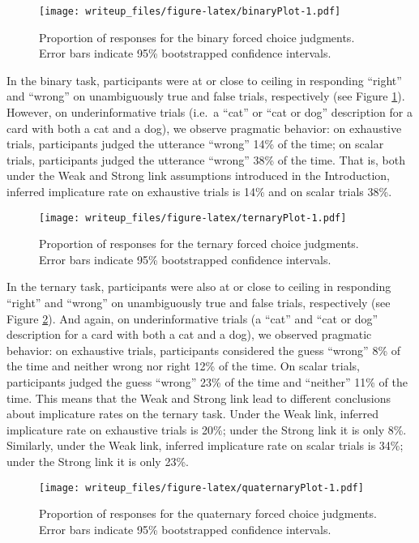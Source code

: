 \documentclass[man]{apa6}
\theoremstyle{definition}
\theoremstyle{definition}
\theoremstyle{definition}
\theoremstyle{remark}
\begin{document}
\begin{figure}
\centering
\texttt{[image: writeup\_files/figure-latex/binaryPlot-1.pdf]}
\caption{\label{fig:binaryPlot}Proportion of responses for the binary forced
choice judgments. Error bars indicate 95\% bootstrapped confidence
intervals.}
\end{figure}

In the binary task, participants were at or close to ceiling in
responding \enquote{right} and \enquote{wrong} on unambiguously true and
false trials, respectively (see Figure \ref{fig:binaryPlot}). However,
on underinformative trials (i.e.~a \enquote{cat} or \enquote{cat or dog}
description for a card with both a cat and a dog), we observe pragmatic
behavior: on exhaustive trials, participants judged the utterance
\enquote{wrong} 14\% of the time; on scalar trials, participants judged
the utterance \enquote{wrong} 38\% of the time. That is, both under the
Weak and Strong link assumptions introduced in the Introduction,
inferred implicature rate on exhaustive trials is 14\% and on scalar
trials 38\%.

\begin{figure}
\centering
\texttt{[image: writeup\_files/figure-latex/ternaryPlot-1.pdf]}
\caption{\label{fig:ternaryPlot}Proportion of responses for the ternary
forced choice judgments. Error bars indicate 95\% bootstrapped
confidence intervals.}
\end{figure}

In the ternary task, participants were also at or close to ceiling in
responding \enquote{right} and \enquote{wrong} on unambiguously true and
false trials, respectively (see Figure \ref{fig:ternaryPlot}). And
again, on underinformative trials (a \enquote{cat} and \enquote{cat or
dog} description for a card with both a cat and a dog), we observed
pragmatic behavior: on exhaustive trials, participants considered the
guess \enquote{wrong} 8\% of the time and neither wrong nor right 12\%
of the time. On scalar trials, participants judged the guess
\enquote{wrong} 23\% of the time and \enquote{neither} 11\% of the time.
This means that the Weak and Strong link lead to different conclusions
about implicature rates on the ternary task. Under the Weak link,
inferred implicature rate on exhaustive trials is 20\%; under the Strong
link it is only 8\%. Similarly, under the Weak link, inferred
implicature rate on scalar trials is 34\%; under the Strong link it is
only 23\%.

\begin{figure}
\centering
\texttt{[image: writeup\_files/figure-latex/quaternaryPlot-1.pdf]}
\caption{\label{fig:quaternaryPlot}Proportion of responses for the
quaternary forced choice judgments. Error bars indicate 95\%
bootstrapped confidence intervals.}
\end{figure}
\end{document}
